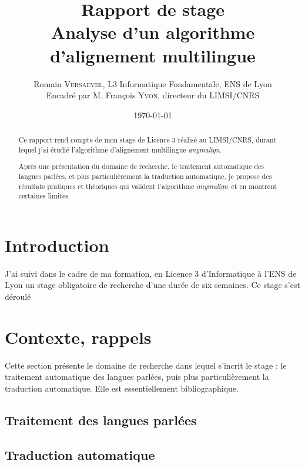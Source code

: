 \documentclass[a4paper,10pt]{article}
\title{ \Large Rapport de stage \\ \LARGE Analyse d'un algorithme d'alignement multilingue}
\author{\normalsize Romain \textsc{Versaevel}, L3 Informatique Fondamentale, ENS de Lyon \\ \normalsize Encadré par M. François \textsc{Yvon}, directeur du LIMSI/CNRS \\}
\date{\today}
\newcommand{\anym}{\emph{anymalign}}
\begin{document}
\maketitle

\begin{abstract}
Ce rapport rend compte de mon stage de Licence 3 réalisé au LIMSI/CNRS, durant lequel j'ai étudié l'algorithme d'alignement multilingue \anym .

Après une présentation du domaine de recherche, le traitement automatique des langues parlées, et plus particulièrement la traduction automatique, je propose des résultats pratiques et théoriques qui valident l'algorithme \anym~et en montrent certaines limites. %
\end{abstract}

\newpage
\tableofcontents
\newpage

\section{Introduction}
J'ai suivi dans le cadre de ma formation, en Licence 3 d'Informatique à l'ENS de Lyon un stage obligatoire de recherche d'une durée de six semaines. Ce stage s'est déroulé 

\section{Contexte, rappels}

Cette section présente le domaine de recherche dans lequel s'incrit le stage : le traitement automatique des langues parlées, puis plus particulièrement la traduction automatique. Elle est essentiellement bibliographique.

\subsection{Traitement des langues parlées}






\subsection{Traduction automatique}
\end{document}
